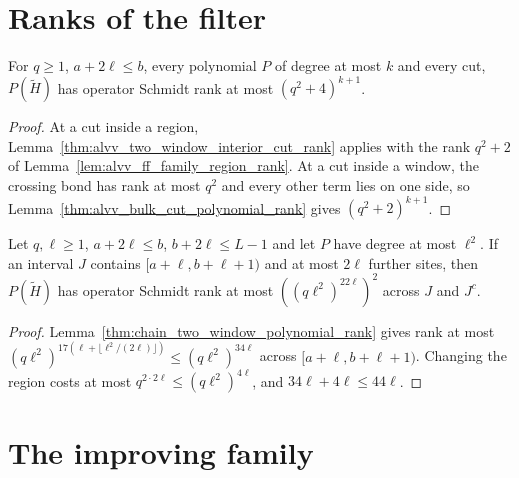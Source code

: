 \section{Ranks of the filter}

\begin{lemma}
    \label{lem:alvv_ff_family_cut_rank}
    \leanok
    For $q\ge1$, $a+2\ell\le b$, every polynomial $P$ of degree at most $k$
    and every cut, $P(\widetilde H)$ has operator Schmidt rank at most
    $(q^2+4)^{k+1}$.
\end{lemma}
\begin{proof}\leanok
    At a cut inside a region, Lemma~\ref{thm:alvv_two_window_interior_cut_rank}
    applies with the rank $q^2+2$ of Lemma~\ref{lem:alvv_ff_family_region_rank}.
    At a cut inside a window, the crossing bond has rank at most $q^2$ and every
    other term lies on one side, so
    Lemma~\ref{thm:alvv_bulk_cut_polynomial_rank} gives $(q^2+2)^{k+1}$.
\end{proof}

\begin{lemma}
    \label{lem:alvv_ff_family_region_rank_filter}
    \leanok
    Let $q,\ell\ge1$, $a+2\ell\le b$, $b+2\ell\le L-1$ and let $P$ have degree at
    most $\ell^2$. If an interval $J$ contains $[a+\ell,b+\ell+1)$ and at most
    $2\ell$ further sites, then $P(\widetilde H)$ has operator Schmidt rank at
    most $((q\ell^2)^{22\ell})^2$ across $J$ and $J^c$.
\end{lemma}
\begin{proof}\leanok
    Lemma~\ref{thm:chain_two_window_polynomial_rank} gives rank at most
    $(q\ell^2)^{17(\ell+\lfloor\ell^2/(2\ell)\rfloor)}\le(q\ell^2)^{34\ell}$
    across $[a+\ell,b+\ell+1)$. Changing the region costs at most
    $q^{2\cdot2\ell}\le(q\ell^2)^{4\ell}$, and $34\ell+4\ell\le44\ell$.
\end{proof}

\section{The improving family}

